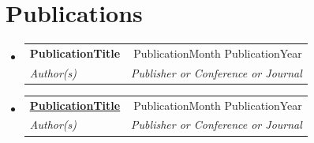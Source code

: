 \documentclass[letterpaper,11pt]{article}
\makeatletter
\newcommand{\resumeSubheading}[4]{
  \vspace{-2pt}\item
    \begin{tabular*}{0.97\textwidth}[t]{l@{\extracolsep{\fill}}r}
      \textbf{#1} & #2 \\[-2pt]
      \textit{\small#3} & \textit{\small #4} \\
    \end{tabular*}\vspace{-7pt}
}
\newcommand{\resumeSubHeadingListStart}{\begin{itemize}[leftmargin=0.15in, label={}]}
\newcommand{\resumeSubHeadingListEnd}{\end{itemize}\vspace{-6pt}}
\makeatother
\begin{document}
\section{Publications}
  \resumeSubHeadingListStart
    \resumeSubheading
      {PublicationTitle}{PublicationMonth PublicationYear}
      {Author(s)}{Publisher or Conference or Journal}
    \resumeSubheading
      {\href{linkToPublication}{\underline{PublicationTitle}}}{PublicationMonth PublicationYear}
      {Author(s)}{Publisher or Conference or Journal}
  \resumeSubHeadingListEnd

\end{document}
